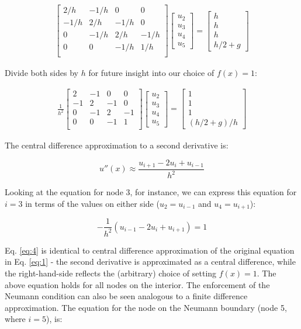 \documentclass[10pt]{article}
\newcommand{\beq}{\begin{equation}}
\newcommand{\eeq}{\end{equation}}
\newcommand{\beqa}{\begin{equation}\begin{aligned}}
\newcommand{\eeqa}{\end{aligned}\end{equation}}
\begin{document}
\beqa
\label{eq:3}
\begin{bmatrix}
 2/h & -1/h & 0 & 0 \\
 -1/h & 2/h & -1/h & 0 \\
 0 & -1/h & 2/h & -1/h\\
 0 & 0 & -1/h & 1/h\\
\end{bmatrix}
\begin{bmatrix}u_2\\u_3\\u_4\\u_5\end{bmatrix} = 
\begin{bmatrix}
h\\h\\h\\h/2+g
\end{bmatrix}
\eeqa

Divide both sides by \(h\) for future insight into our choice of \(f(x)=1\):

\beqa
\label{eq:3}\frac{1}{h^2}
\begin{bmatrix}
 2 & -1 & 0 & 0 \\
 -1 & 2 & -1 & 0 \\
 0 & -1 & 2 & -1\\
 0 & 0 & -1 & 1\\
\end{bmatrix}
\begin{bmatrix}u_2\\u_3\\u_4\\u_5\end{bmatrix} = 
\begin{bmatrix}
1\\1\\1\\(h/2+g)/h
\end{bmatrix}
\eeqa

The central difference approximation to a second derivative is:

\beq
u''(x)\approx \frac{u_{i+1}-2u_i+u_{i-1}}{h^2}
\eeq

Looking at the equation for node 3, for instance, we can express this equation for \(i=3\) in terms of the values on either side (\(u_2=u_{i-1}\) and \(u_4=u_{i+1}\)):

\beq
\label{eq:4}
-\frac{1}{h^2}\left(u_{i-1}-2u_i+u_{i+1}\right)=1
\eeq

Eq. \eqref{eq:4} is identical to central difference approximation of the original equation in Eq. \eqref{eq:1} - the second derivative is approximated as a central difference, while the right-hand-side reflects the (arbitrary) choice of setting \(f(x)=1\). The above equation holds for all nodes on the interior. The enforcement of the Neumann condition can also be seen analogous to a finite difference approximation. The equation for the node on the Neumann boundary (node 5, where \(i=5\)), is:
\end{document}
